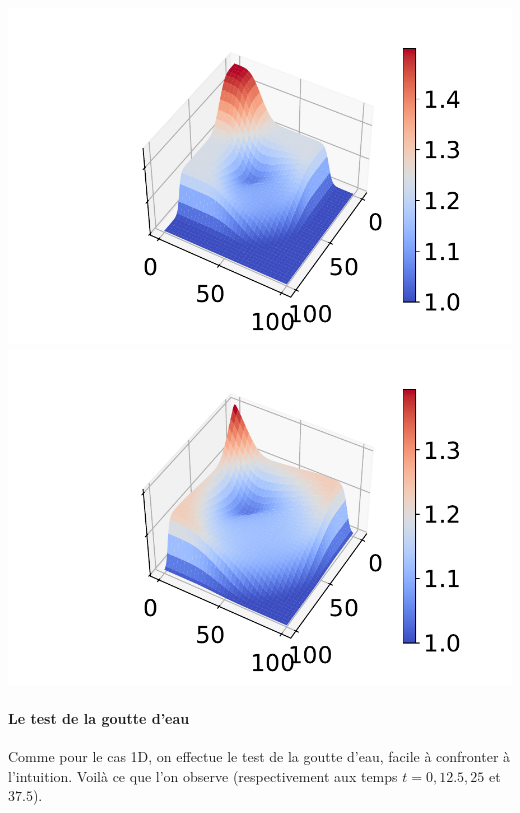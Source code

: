 \documentclass[
11pt, %
francais, %
singlespacing, %
headsepline, %
f%
]{MastersDoctoralThesis} %
\theoremstyle{definition}
\begin{document}
\begin{center}
\includegraphics[scale = 0.6]{barrage2D2}
\includegraphics[scale = 0.6]{barrage2D3} 
\end{center}

\paragraph{Le test de la goutte d'eau}

\medskip

Comme pour le cas 1D, on effectue le test de la goutte d'eau, facile à confronter à l'intuition. Voilà ce que l'on observe (respectivement aux temps $t=0, 12.5, 25$ et $37.5$).
\end{document}
